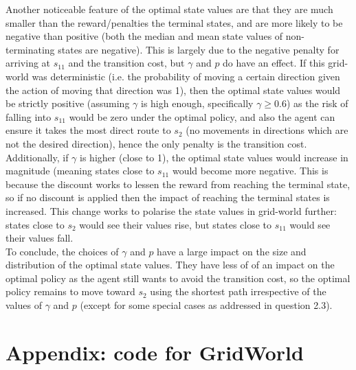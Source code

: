\documentclass[12pt,twoside]{article}
\begin{document}
Another noticeable feature of the optimal state values are that they are much smaller than the reward/penalties the terminal states, and are more likely to be negative than positive (both the median and mean state values of non-terminating states are negative). This is largely due to the negative penalty for arriving at $s_{11}$ and the transition cost, but $\gamma$ and $p$ do have an effect. If this grid-world was deterministic (i.e. the probability of moving a certain direction given the action of moving that direction was 1), then the optimal state values would be strictly positive (assuming $\gamma$ is high enough, specifically $\gamma \geq 0.6$) as the risk of falling into $s_{11}$ would be zero under the optimal policy, and also the agent can ensure it takes the most direct route to $s_2$ (no movements in directions which are not the desired direction), hence the only penalty is the transition cost. \\

Additionally, if $\gamma$ is higher (close to 1), the optimal state values would increase in magnitude (meaning states close to $s_{11}$ would become more negative. This is because the discount works to lessen the reward from reaching the terminal state, so if no discount is applied then the impact of reaching the terminal states is increased. This change works to polarise the state values in grid-world further: states close to $s_2$ would see their values rise, but states close to $s_{11}$ would see their values fall.\\

To conclude, the choices of $\gamma$ and $p$ have a large impact on the size and distribution of the optimal state values. They have less of of an impact on the optimal policy as the agent still wants to avoid the transition cost, so the optimal policy remains to move toward $s_2$ using the shortest path irrespective of the values of $\gamma$ and $p$ (except for some special cases as addressed in question 2.3).



\newpage

\section{Appendix: code for GridWorld}
\end{document}
